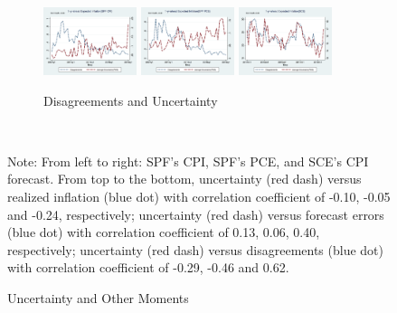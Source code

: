 \documentclass[]{article}
\begin{document}
\begin{figure}[ht]
\begin{subfigure}[b]{\textwidth}
		\end{subfigure}
	 \vspace{0.5em}
		\vfill
		\begin{subfigure}[b]{\textwidth}
			\centering
			\caption{Disagreements and Uncertainty}
			\label{DisgVar}
			\includegraphics[width=0.3\textwidth]{figures/CPI_disg_varSPFCPIQ.png}
			\includegraphics[width=0.3\textwidth]{figures/PCE_disg_varSPFPCEQ.png}
			\includegraphics[width=0.3\textwidth]{figures/Q9_disg_varSCEM.png}\\
		\end{subfigure}
		\\
		\begin{flushleft}
			{\footnotesize Note:  From left to right: SPF’s CPI, SPF’s PCE, and SCE’s CPI forecast. From top to the bottom, uncertainty (red dash) versus realized inflation (blue dot) with correlation coefficient of -0.10, -0.05 and -0.24, respectively; uncertainty (red dash) versus forecast errors (blue dot) with correlation coefficient of 0.13, 0.06, 0.40, respectively; uncertainty (red dash) versus  disagreements (blue dot) with correlation coefficient of -0.29, -0.46 and 0.62. }
		\end{flushleft}
		\caption{Uncertainty and Other Moments}
		\label{UnceratitnyOtherMoments}
	\end{figure}
	
\end{document}
